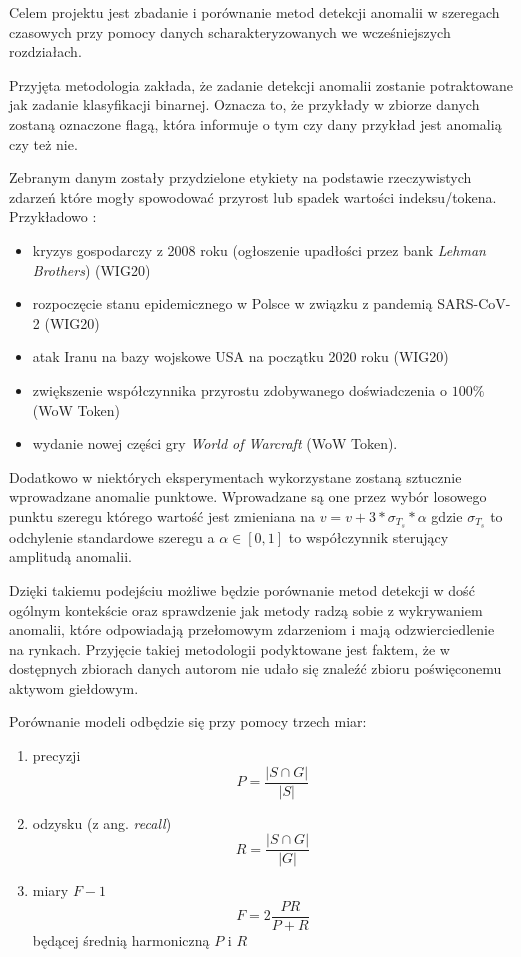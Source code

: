 \documentclass{article}
\begin{document}
Celem projektu jest zbadanie i porównanie metod detekcji anomalii w
szeregach czasowych przy pomocy danych scharakteryzowanych we
wcześniejszych rozdziałach.

Przyjęta metodologia zakłada, że zadanie detekcji anomalii zostanie
potraktowane jak zadanie klasyfikacji binarnej. Oznacza to, że przykłady
w zbiorze danych zostaną oznaczone flagą, która informuje o tym czy dany
przykład jest anomalią czy też nie.

Zebranym danym zostały przydzielone etykiety na podstawie rzeczywistych zdarzeń które mogły spowodować przyrost lub spadek wartości indeksu/tokena. Przykładowo : 

\begin{itemize}
  \item kryzys gospodarczy z 2008 roku (ogłoszenie upadłości przez bank \emph{Lehman Brothers}) (WIG20)
\item rozpoczęcie stanu epidemicznego w Polsce w związku z pandemią SARS-CoV-2 (WIG20)
\item atak Iranu na bazy wojskowe USA na początku 2020 roku (WIG20)
\item zwiększenie współczynnika przyrostu zdobywanego doświadczenia o $100 \%$ (WoW Token)
\item wydanie nowej części gry \emph{World of Warcraft} (WoW Token).
\end{itemize}

Dodatkowo w niektórych eksperymentach wykorzystane zostaną sztucznie wprowadzane anomalie punktowe. Wprowadzane są one przez wybór losowego punktu szeregu którego wartość jest zmieniana na $v = v+3*\sigma_{T_s}*\alpha$ gdzie $\sigma_{T_s}$ to odchylenie standardowe szeregu a $\alpha \in [0,1]$ to współczynnik sterujący amplitudą anomalii.  

Dzięki takiemu podejściu możliwe będzie porównanie metod detekcji w dość
ogólnym kontekście oraz sprawdzenie jak metody radzą sobie z wykrywaniem
anomalii, które odpowiadają przełomowym zdarzeniom i mają
odzwierciedlenie na rynkach. Przyjęcie takiej metodologii podyktowane jest faktem, że w dostępnych zbiorach danych autorom nie udało się znaleźć zbioru poświęconemu aktywom giełdowym.

Porównanie modeli odbędzie się przy pomocy trzech miar:

\begin{enumerate}
\def\labelenumi{\arabic{enumi}.}
\item
  precyzji 
    \begin{equation*}
       P = \frac{|S \cap G|}{|S|}
    \end{equation*}
\item
  odzysku (z ang. \emph{recall}) 
    \begin{equation*}
      R = \frac{|S \cap G|}{|G|}
    \end{equation*}

\item
  miary $F-1$
    \begin{equation*}
    F = 2\frac{PR}{P + R}
    \end{equation*}
  będącej średnią harmoniczną \(P\) i \(R\)
\end{enumerate}
\end{document}
